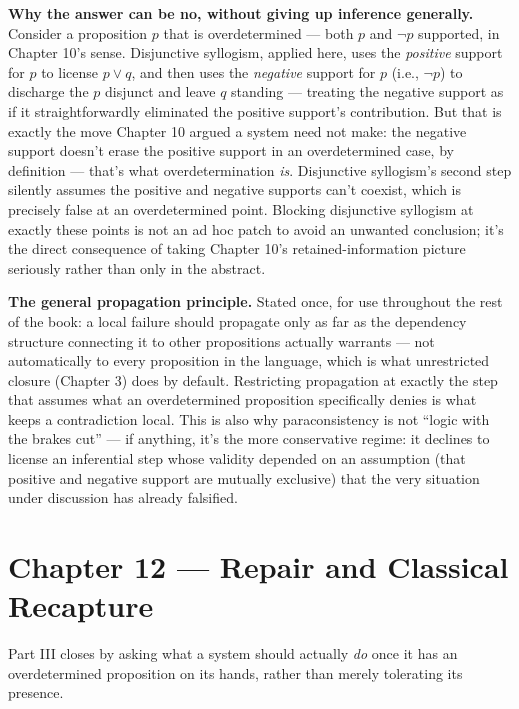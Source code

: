 \textbf{Why the answer can be no, without giving up inference generally.}
Consider a proposition \(p\) that is overdetermined --- both \(p\) and \(\neg p\)
supported, in Chapter 10's sense. Disjunctive syllogism, applied here,
uses the \emph{positive} support for \(p\) to license \(p \vee q\), and then uses
the \emph{negative} support for \(p\) (i.e., \(\neg p\)) to discharge the \(p\)
disjunct and leave \(q\) standing --- treating the negative support as if it
straightforwardly eliminated the positive support's contribution. But
that is exactly the move Chapter 10 argued a system need not make: the
negative support doesn't erase the positive support in an overdetermined
case, by definition --- that's what overdetermination \emph{is}. Disjunctive
syllogism's second step silently assumes the positive and negative
supports can't coexist, which is precisely false at an overdetermined
point. Blocking disjunctive syllogism at exactly these points is not an
ad hoc patch to avoid an unwanted conclusion; it's the direct consequence
of taking Chapter 10's retained-information picture seriously rather than
only in the abstract.

\textbf{The general propagation principle.} Stated once, for use throughout
the rest of the book: a local failure should propagate only as far as
the dependency structure connecting it to other propositions actually
warrants --- not automatically to every proposition in the language, which
is what unrestricted closure (Chapter 3) does by default. Restricting
propagation at exactly the step that assumes what an overdetermined
proposition specifically denies is what keeps a contradiction local. This
is also why paraconsistency is not ``logic with the brakes cut'' --- if
anything, it's the more conservative regime: it declines to license an
inferential step whose validity depended on an assumption (that positive
and negative support are mutually exclusive) that the very situation
under discussion has already falsified.

\hypertarget{chapter-12-repair-and-classical-recapture}{%
\chapter*{Chapter 12 --- Repair and Classical Recapture}
\label{chapter-12-repair-and-classical-recapture}}

Part III closes by asking what a system should actually \emph{do} once it
has an overdetermined proposition on its hands, rather than merely
tolerating its presence.


